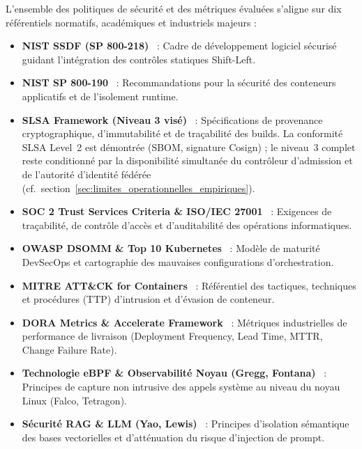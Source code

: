L'ensemble des politiques de sécurité et des métriques évaluées s'aligne sur dix référentiels normatifs, académiques et industriels majeurs :
\begin{itemize}
    \item \textbf{NIST SSDF (SP 800-218)}~\cite{nist_ssdf_800_218} : Cadre de développement logiciel sécurisé guidant l'intégration des contrôles statiques Shift-Left.
    \item \textbf{NIST SP 800-190}~\cite{nist_sp_800_190} : Recommandations pour la sécurité des conteneurs applicatifs et de l'isolement runtime.
    \item \textbf{SLSA Framework (Niveau 3 visé)}~\cite{slsa_spec_v1} : Spécifications de provenance cryptographique, d'immutabilité et de traçabilité des builds. La conformité SLSA Level~2 est démontrée (SBOM, signature Cosign) ; le niveau~3 complet reste conditionné par la disponibilité simultanée du contrôleur d'admission et de l'autorité d'identité fédérée (cf.\ section~\ref{sec:limites_operationnelles_empiriques}).
    \item \textbf{SOC 2 Trust Services Criteria \& ISO/IEC 27001}~\cite{soc2_trust_services_criteria, iso_27001_2022} : Exigences de traçabilité, de contrôle d'accès et d'auditabilité des opérations informatiques.
    \item \textbf{OWASP DSOMM \& Top 10 Kubernetes}~\cite{owasp_dsomm, owasp_k8s_top10} : Modèle de maturité DevSecOps et cartographie des mauvaises configurations d'orchestration.
    \item \textbf{MITRE ATT\&CK for Containers}~\cite{mitre_attack_containers} : Référentiel des tactiques, techniques et procédures (TTP) d'intrusion et d'évasion de conteneur.
    \item \textbf{DORA Metrics \& Accelerate Framework}~\cite{dora_metrics_2018} : Métriques industrielles de performance de livraison (Deployment Frequency, Lead Time, MTTR, Change Failure Rate).
    \item \textbf{Technologie eBPF \& Observabilité Noyau (Gregg, Fontana)}~\cite{gregg_ebpf_2020, fontana_ebpf_security} : Principes de capture non intrusive des appels système au niveau du noyau Linux (Falco, Tetragon).
    \item \textbf{Sécurité RAG \& LLM (Yao, Lewis)}~\cite{yao_rag_security, lewis_rag_2020} : Principes d'isolation sémantique des bases vectorielles et d'atténuation du risque d'injection de prompt.
\end{itemize}




